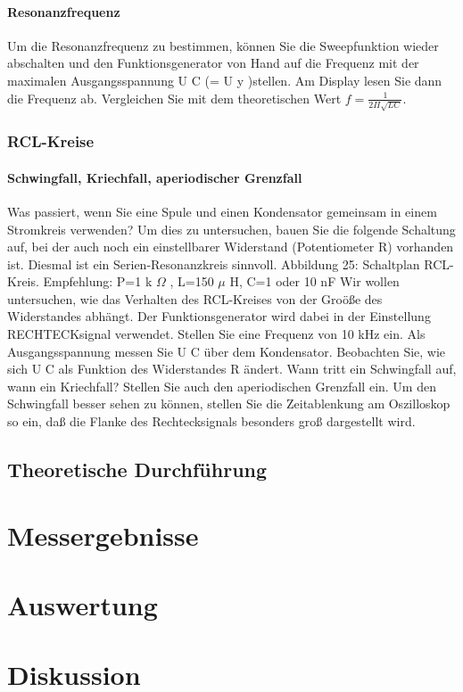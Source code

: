 \documentclass[12pt]{scrartcl}
\begin{document}
\paragraph{Resonanzfrequenz}
Um die Resonanzfrequenz zu bestimmen, können Sie die Sweepfunktion wieder abschalten und den Funktionsgenerator von Hand auf die Frequenz mit der maximalen Ausgangsspannung
U
C
(=
U
y
)stellen. Am Display lesen
Sie dann die Frequenz ab. Vergleichen Sie mit dem theoretischen Wert
$f = \frac{1}{2 \Pi \sqrt{LC}}$.
\subsubsection{RCL-Kreise}
\paragraph{Schwingfall, Kriechfall, aperiodischer Grenzfall}
Was passiert, wenn Sie eine Spule und einen Kondensator gemeinsam in einem Stromkreis verwenden? Um dies zu
untersuchen, bauen Sie die folgende Schaltung auf, bei der auch noch ein einstellbarer Widerstand (Potentiometer
R) vorhanden ist. Diesmal ist ein Serien-Resonanzkreis sinnvoll.
Abbildung 25:
Schaltplan RCL-Kreis. Empfehlung: P=1 k
$\Omega$
, L=150
$\mu$
H, C=1 oder 10 nF
Wir wollen untersuchen, wie das Verhalten des RCL-Kreises von der Groöße des Widerstandes abhängt.
Der Funktionsgenerator wird dabei in der Einstellung RECHTECKsignal verwendet. Stellen Sie eine Frequenz
von 10 kHz ein. Als Ausgangsspannung messen Sie
U
C
über dem Kondensator. Beobachten Sie, wie sich
U
C
als
Funktion des Widerstandes
R
ändert. Wann tritt ein Schwingfall auf, wann ein Kriechfall? Stellen Sie auch den
aperiodischen Grenzfall ein.
Um den Schwingfall besser sehen zu können, stellen Sie die Zeitablenkung am Oszilloskop so ein, daß die Flanke
des Rechtecksignals besonders groß dargestellt wird.
\subsection{Theoretische Durchführung}


\section{Messergebnisse}



\section{Auswertung}


\section{Diskussion}


\end{document}
